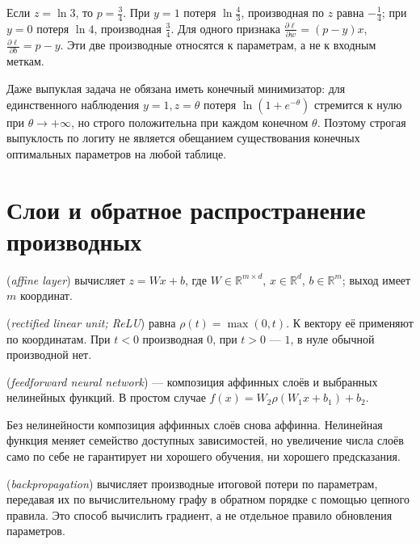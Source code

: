 \begin{example}Если \(z=\ln3\), то \(p=\frac34\). При \(y=1\) потеря \(\ln\frac43\), производная по \(z\) равна \(-\frac14\); при \(y=0\) потеря \(\ln4\), производная \(\frac34\). Для одного признака \(\frac{\partial\ell}{\partial w}=(p-y)x\), \(\frac{\partial\ell}{\partial b}=p-y\). Эти две производные относятся к параметрам, а не к входным меткам.\end{example}
Даже выпуклая задача не обязана иметь конечный минимизатор: для единственного наблюдения \(y=1,z=\theta\) потеря \(\ln(1+e^{-\theta})\) стремится к нулю при \(\theta\to+\infty\), но строго положительна при каждом конечном \(\theta\). Поэтому строгая выпуклость по логиту не является обещанием существования конечных оптимальных параметров на любой таблице.
\section{Слои и обратное распространение производных}
\begin{definition} (\emph{affine layer}) вычисляет \(z=Wx+b\), где \(W\in\mathbb R^{m\times d}\), \(x\in\mathbb R^d\), \(b\in\mathbb R^m\); выход имеет \(m\) координат.\end{definition}
\begin{definition} (\emph{rectified linear unit; ReLU}) равна \(\rho(t)=\max(0,t)\). К вектору её применяют по координатам. При \(t<0\) производная \(0\), при \(t>0\) --- \(1\), в нуле обычной производной нет.\end{definition}
\begin{definition} (\emph{feedforward neural network}) --- композиция аффинных слоёв и выбранных нелинейных функций. В простом случае \(f(x)=W_2\rho(W_1x+b_1)+b_2\).\end{definition}
Без нелинейности композиция аффинных слоёв снова аффинна. Нелинейная функция меняет семейство доступных зависимостей, но увеличение числа слоёв само по себе не гарантирует ни хорошего обучения, ни хорошего предсказания.
\begin{definition} (\emph{backpropagation}) вычисляет производные итоговой потери по параметрам, передавая их по вычислительному графу в обратном порядке с помощью цепного правила. Это способ вычислить градиент, а не отдельное правило обновления параметров.\end{definition}
